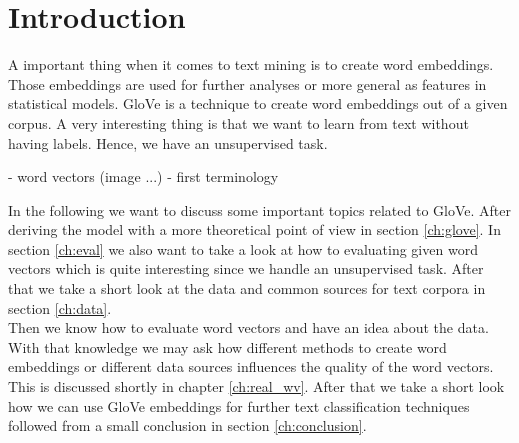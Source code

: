 \chapter{Introduction}

A important thing when it comes to text mining is to create word embeddings. Those embeddings
are used for further analyses or more general as features in statistical models. GloVe is a 
technique to create word embeddings out of a given corpus. A very interesting thing is that
we want to learn from text without having labels. Hence, we have an unsupervised task. 


- word vectors (image ...)
- first terminology

In the following we want to discuss some important topics related to GloVe. After 
deriving the model with a more theoretical point of view in section \ref{ch:glove}. 
In section \ref{ch:eval} we also want to take a look at how to evaluating given word 
vectors which is quite interesting since we handle an unsupervised task. After that we 
take a short look at the data and common sources for text corpora in section \ref{ch:data}. \\

Then we know how to evaluate word vectors and have an idea about the data. With that 
knowledge we may ask how different methods to create word embeddings or different data 
sources influences the quality of the word vectors. This is discussed shortly in chapter
\ref{ch:real_wv}. After that we take a short look how we can use GloVe embeddings for
further text classification techniques followed from a small conclusion in section
\ref{ch:conclusion}.
